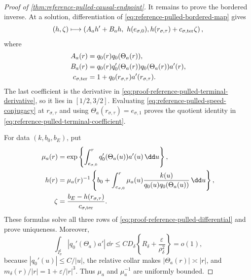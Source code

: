\begin{proof}[Proof of
\cref{thm:reference-pulled-causal-endpoint}]
It remains to prove the bordered inverse.  At a solution, differentiation
of \cref{eq:reference-pulled-bordered-map} gives
\begin{equation}
 (h,\zeta)\longmapsto
 \left(A_a h'+B_a h,\ h(e_{\sigma,0}),
        h(r_{\sigma,\tau})+c_{\sigma,{\rm ter}}\zeta\right),
                                                        \label{eq:proof-reference-pulled-differential}
\end{equation}
where
\begin{align}
 A_a(r)&=q_0(r)q_0(\Theta_a(r)),\notag\\
 B_a(r)&=q_0(r)q_0'(\Theta_a(r))
             q_0(\Theta_a(r))a'(r),              \label{eq:proof-reference-pulled-linear-coefficients}\\
 c_{\sigma,{\rm ter}}
 &=1+q_0(r_{\sigma,\tau})a'(r_{\sigma,\tau}).
\end{align}
The last coefficient is the derivative in
\cref{eq:proof-reference-pulled-terminal-derivative}, so it lies in
\([1/2,3/2]\).  Evaluating
\cref{eq:reference-pulled-speed-conjugacy} at
\(r_{\sigma,\tau}\) and using
\(\Theta_a(r_{\sigma,\tau})=e_{\sigma,1}\) proves the quotient identity
in \cref{eq:reference-pulled-terminal-coefficient}.

For data \((k,b_0,b_E)\), put
\begin{align}
 \mu_a(r)&=\exp\left\{\int_{e_{\sigma,0}}^r
          q_0'(\Theta_a(u))a'(u)\,\dd u\right\},\notag\\
 h(r)&=\mu_a(r)^{-1}\left\{b_0+
   \int_{e_{\sigma,0}}^r
    \mu_a(u)\frac{k(u)}
      {q_0(u)q_0(\Theta_a(u))}\,\dd u\right\},\notag\\
 \zeta&=\frac{b_E-h(r_{\sigma,\tau})}
                 {c_{\sigma,{\rm ter}}}.         \label{eq:proof-reference-pulled-explicit-inverse}
\end{align}
These formulas solve all three rows of
\cref{eq:proof-reference-pulled-differential} and prove uniqueness.
Moreover,
\begin{equation}
 \int_{I_\sigma^\sharp}
  |q_0'(\Theta_a)a'|\,\dd r
 \le CD_\delta\left\{R_\delta+
              \frac{\varepsilon}{\rho_\delta^2}\right\}=o(1),            \label{eq:proof-reference-pulled-integrating-factor}
\end{equation}
because \(|q_0'(u)|\le C/|u|\), the relative collar makes
\(|\Theta_a(r)|\asymp|r|\), and
\(m_\delta(r)/|r|=1+\varepsilon/|r|^3\).
Thus \(\mu_a\) and \(\mu_a^{-1}\) are uniformly bounded.


\end{proof}
